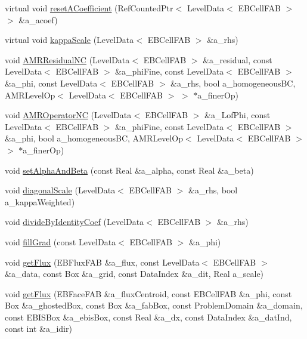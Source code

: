 \begin{DoxyCompactItemize}
\item 
virtual void \hyperlink{classebconductivityop_ae2e298cb54bdc5de3725b57e6e7c3329}{reset\+A\+Coefficient} (Ref\+Counted\+Ptr$<$ Level\+Data$<$ E\+B\+Cell\+F\+AB $>$ $>$ \&a\+\_\+acoef)
\item 
virtual void \hyperlink{classebconductivityop_ae884cb07f589e1dfec174350ba8b1bae}{kappa\+Scale} (Level\+Data$<$ E\+B\+Cell\+F\+AB $>$ \&a\+\_\+rhs)
\item 
void \hyperlink{classebconductivityop_a9e2eb2add2b0a5fd698815346cf58f08}{A\+M\+R\+Residual\+NC} (Level\+Data$<$ E\+B\+Cell\+F\+AB $>$ \&a\+\_\+residual, const Level\+Data$<$ E\+B\+Cell\+F\+AB $>$ \&a\+\_\+phi\+Fine, const Level\+Data$<$ E\+B\+Cell\+F\+AB $>$ \&a\+\_\+phi, const Level\+Data$<$ E\+B\+Cell\+F\+AB $>$ \&a\+\_\+rhs, bool a\+\_\+homogeneous\+BC, A\+M\+R\+Level\+Op$<$ Level\+Data$<$ E\+B\+Cell\+F\+AB $>$ $>$ $\ast$a\+\_\+finer\+Op)
\item 
void \hyperlink{classebconductivityop_aed08b7f0c52b704d23fe503419e14c6b}{A\+M\+R\+Operator\+NC} (Level\+Data$<$ E\+B\+Cell\+F\+AB $>$ \&a\+\_\+\+Lof\+Phi, const Level\+Data$<$ E\+B\+Cell\+F\+AB $>$ \&a\+\_\+phi\+Fine, const Level\+Data$<$ E\+B\+Cell\+F\+AB $>$ \&a\+\_\+phi, bool a\+\_\+homogeneous\+BC, A\+M\+R\+Level\+Op$<$ Level\+Data$<$ E\+B\+Cell\+F\+AB $>$ $>$ $\ast$a\+\_\+finer\+Op)
\item 
void \hyperlink{classebconductivityop_a2c32fe6199aa14e93fc5463f26897a7e}{set\+Alpha\+And\+Beta} (const Real \&a\+\_\+alpha, const Real \&a\+\_\+beta)
\item 
void \hyperlink{classebconductivityop_a5dd98548cbce0b19d59402cd7fee4d84}{diagonal\+Scale} (Level\+Data$<$ E\+B\+Cell\+F\+AB $>$ \&a\+\_\+rhs, bool a\+\_\+kappa\+Weighted)
\item 
void \hyperlink{classebconductivityop_a7be4b9b11ebe376088b16896d2c63847}{divide\+By\+Identity\+Coef} (Level\+Data$<$ E\+B\+Cell\+F\+AB $>$ \&a\+\_\+rhs)
\item 
void \hyperlink{classebconductivityop_a497a724396611eb1d5e57aa4b7506b0d}{fill\+Grad} (const Level\+Data$<$ E\+B\+Cell\+F\+AB $>$ \&a\+\_\+phi)
\item 
void \hyperlink{classebconductivityop_a4747b8523528861acec7a84a71d1f919}{get\+Flux} (E\+B\+Flux\+F\+AB \&a\+\_\+flux, const Level\+Data$<$ E\+B\+Cell\+F\+AB $>$ \&a\+\_\+data, const Box \&a\+\_\+grid, const Data\+Index \&a\+\_\+dit, Real a\+\_\+scale)
\item 
void \hyperlink{classebconductivityop_a83cf4d3aba096c98d9c5ea9237a2defa}{get\+Flux} (E\+B\+Face\+F\+AB \&a\+\_\+flux\+Centroid, const E\+B\+Cell\+F\+AB \&a\+\_\+phi, const Box \&a\+\_\+ghosted\+Box, const Box \&a\+\_\+fab\+Box, const Problem\+Domain \&a\+\_\+domain, const E\+B\+I\+S\+Box \&a\+\_\+ebis\+Box, const Real \&a\+\_\+dx, const Data\+Index \&a\+\_\+dat\+Ind, const int \&a\+\_\+idir)

\end{DoxyCompactItemize}

